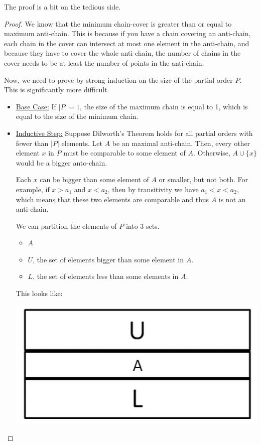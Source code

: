 \documentclass[letterpaper]{article}
\begin{document}
The proof is a bit on the tedious side.
\begin{proof}
    We know that the minimum chain-cover is greater than or equal to maximum anti-chain. This is because if you have a chain covering an anti-chain, each chain in the cover can intersect at most one element in the anti-chain, and because they have to cover the whole anti-chain, the number of chains in the cover needs to be at least the number of points in the anti-chain. 
    
    \bigskip 

    Now, we need to prove by strong induction on the size of the partial order $P$. This is significantly more difficult.
    \begin{itemize}
        \item[\mdiamond] \underline{Base Case:} If $|P| = 1$, the size of the maximum chain is equal to 1, which is equal to the size of the minimum chain. 
        \item[\mdiamond] \underline{Inductive Step:} Suppose Dilworth's Theorem holds for all partial orders with fewer than $|P|$ elements. Let $A$ be an maximal anti-chain. Then, every other element $x$ in $P$ must be comparable to some element of $A$. Otherwise, $A \cup \{x\}$ would be a bigger anto-chain. 
        
        \bigskip 

        Each $x$ can be bigger than some element of $A$ or smaller, but not both. For example, if $x > a_1$ and $x < a_2$, then by transitivity we have $a_1 < x < a_2$, which means that these two elements are comparable and thus $A$ is not an anti-chain. 

        We can partition the elements of $P$ into 3 sets. 
        \begin{itemize}
            \item $A$ 
            \item $U$, the set of elements bigger than some element in $A$. 
            \item $L$, the set of elements less than some elements in $A$. 
        \end{itemize}
        This looks like:
        \begin{center}
            \includegraphics[scale=0.5]{dil_pic_proof.PNG}
        \end{center}


\end{itemize}
\end{proof}
\end{document}
